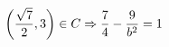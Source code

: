 \documentclass[preview]{standalone}
\begin{document}
\begin{align*}
\special{dvisvgm:raw <g id='unique000'>}\left(\frac{\sqrt{7}}{2},3\right) \in C \Rightarrow \frac{7}{4} - \frac{9}{b^2}=1\special{dvisvgm:raw </g>}
\end{align*}
\end{document}
